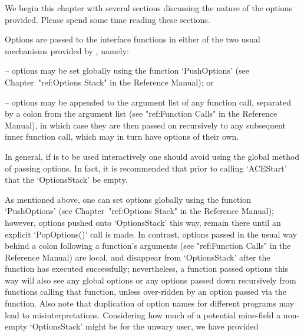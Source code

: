 We begin this chapter with several sections discussing the  nature  of
the options provided. Please spend some time reading these sections.


Options are passed to the {\ACE} interface functions in either of the
two usual mechanisms provided by {\GAP}, namely:

\beginlist

\item{--} options may be set globally using the function `PushOptions'
(see Chapter~"ref:Options Stack" in the {\GAP} Reference  Manual); or

\item{--} options may be appended to the argument list of any function
call, separated by a colon from the argument list  (see  "ref:Function
Calls" in the {\GAP} Reference Manual), in which case  they  are  then
passed on recursively to any subsequent inner function call, which may
in turn have options of their own.

\endlist

In general, if {\ACE} is to be used  interactively  one  should  avoid
using the global method of passing options. In fact, it is recommended
that prior to calling `ACEStart' that the `OptionsStack' be empty.


\beginitems

As mentioned above, one can set options globally  using  the  function
`PushOptions' (see Chapter~"ref:Options Stack" in the {\GAP} Reference
Manual); however, options pushed onto `OptionsStack' this way,  remain
there until an explicit `PopOptions()'  call  is  made.  In  contrast,
options passed in the usual way behind a colon following a  function's
arguments (see "ref:Function Calls" in the  {\GAP}  Reference  Manual)
are local, and disappear from `OptionsStack' after  the  function  has
executed successfully; nevertheless, a function  passed  options  this
way will also see any  global  options  or  any  options  passed  down
recursively from functions calling that function,  unless  over-ridden
by an option passed via the function. Also note  that  duplication  of
option names for different programs may  lead  to  misinterpretations.
Considering  how  much  of  a   potential   mine-field   a   non-empty
`OptionsStack' might be for the unwary user, we have provided

